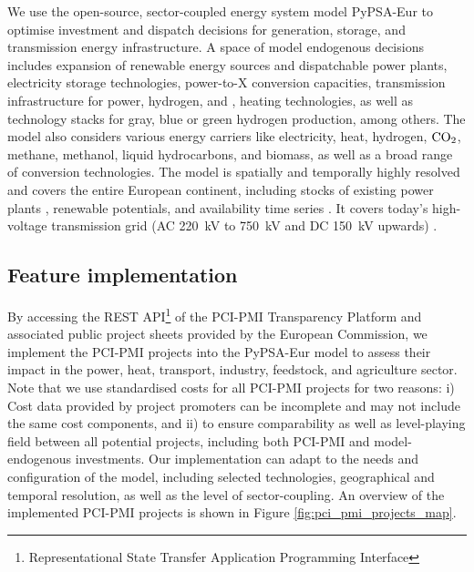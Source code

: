 \documentclass[final,5p,times,twocolumn]{elsarticle}
\let\autocite\cite
\begin{document}
We use the open-source, sector-coupled energy system model PyPSA-Eur \cite{neumannPotentialRoleHydrogen2023,frysztackiComparisonClusteringMethods2022,glaumOffshorePowerHydrogen2024,horschPyPSAEurOpenOptimisation2018} to optimise investment and dispatch decisions for generation, storage, and transmission energy infrastructure. 
A space of model endogenous decisions includes expansion of renewable energy sources and dispatchable power plants, electricity storage technologies, power-to-X conversion capacities, transmission infrastructure for power, hydrogen, and , heating technologies, as well as technology stacks for gray, blue or green hydrogen production, among others. 
The model also considers various energy carriers like electricity, heat, hydrogen, $\ce{CO2}$, methane, methanol, liquid hydrocarbons, and biomass, as well as a broad range of conversion technologies.
The model is spatially and temporally highly resolved and covers the entire European continent, including stocks of existing power plants \autocite{gotzensPerformingEnergyModelling2019}, renewable potentials, and availability time series \autocite{hofmannAtliteLightweightPython2021}. It covers today's high-voltage transmission grid (AC \SI{220}{kV} to \SI{750}{kV} and DC \SI{150}{kV} upwards) \autocite{xiongModellingHighVoltageGrid2024}.

\subsection{Feature implementation}
\label{sec:feature_implementation}

By accessing the REST API\footnote{Representational State Transfer Application Programming Interface} of the PCI-PMI Transparency Platform \autocite{europeancommissionPCIPMITransparencyPlatform2024} and associated public project sheets provided by the European Commission, we implement the PCI-PMI projects into the PyPSA-Eur model to assess their impact in the power, heat, transport, industry, feedstock, and agriculture sector. Note that we use standardised costs for all PCI-PMI projects \autocite{zeyenPyPSATechnologydataV0922024} for two reasons: i) Cost data provided by project promoters can be incomplete and may not include the same cost components, and ii) to ensure comparability as well as level-playing field between all potential projects, including both PCI-PMI and model-endogenous investments.
Our implementation can adapt to the needs and configuration of the model, including selected technologies, geographical and temporal resolution, as well as the level of sector-coupling. An overview of the implemented PCI-PMI projects is shown in Figure \ref{fig:pci_pmi_projects_map}.
\end{document}
